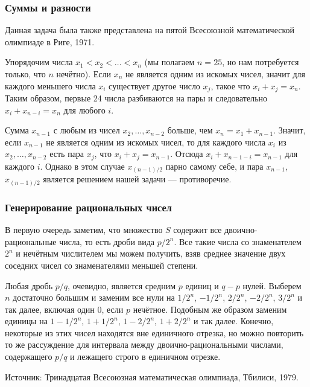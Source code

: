 \subsubsection*{Суммы и разности}%

Данная задача была также представлена на пятой Всесоюзной математической олимпиаде в Риге, 1971.

\medskip

Упорядочим числа $x_1<x_2<\dots<x_n$ (мы полагаем $n=25$, но нам потребуется только, что $n$ нечётно).
Если $x_n$ не является одним из искомых чисел, значит для каждого меньшего числа $x_i$ существует другое число $x_j$, такое что $x_i+x_j=x_n$.
Таким образом, первые 24 числа разбиваются на пары и следовательно $x_i+x_{n-i}=x_n$ для любого $i$.

Сумма $x_{n-1}$ с любым из чисел $x_2,\dots,x_{n-2}$ больше, чем $x_n=x_1+x_{n-1}$.
Значит, если $x_{n-1}$ не является одним из искомых чисел, то для каждого числа $x_i$ из $x_2,\dots,x_{n-2}$ есть пара $x_j$, что 
$x_{i}+x_{j}=x_{n-1}$.
Отсюда $x_{i}+x_{n-1-i}=x_{n-1}$ для каждого $i$.
Однако в этом случае $x_{(n-1)/2}$ парно самому себе, 
и пара $x_{n-1}$, $x_{(n-1)/2}$ является решением нашей задачи --- противоречие.
\heart 

\subsubsection*{Генерирование рациональных чисел}%

В первую очередь заметим, что множество $S$ содержит все двоично-рациональные числа, 
то есть дроби вида $p/2^n$.
Все такие числа со знаменателем $2^n$ и нечётным числителем мы можем получить, взяв среднее значение двух соседних чисел со знаменателями меньшей степени.

Любая дробь $p/q$, очевидно, является средним $p$ единиц и $q-p$ нулей.
Выберем $n$ достаточно большим и заменим все нули на $1/2^n$, $-1/2^n$, $2/2^n$, $-2/2^n$, $3/2^n$ и так далее, включая один $0$, если $p$ нечётное.
Подобным же образом заменим единицы на $1-1/2^n$, $1+1/2^n$, $1-2/2^n$, $1+2/2^n$ и так далее.
Конечно, некоторые из этих чисел находятся вне единичного отрезка, но можно повторить то же рассуждение для интервала между двоично-рациональными числами, содержащего $p/q$ и лежащего строго в единичном отрезке.%
\heart

Источник: Тринадцатая Всесоюзная математическая олимпиада, Тбилиси, 1979.

